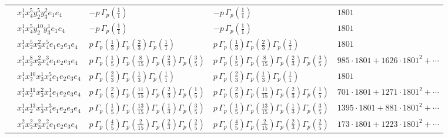 \documentclass[11pt]{article}
\begin{document}
\begin{table}[ht]
{\begin{tabular}{@{}lllll@{}}
 & $x_{1}^{1} x_{4}^{5} y_{2}^{5} y_{3}^{2} e_{1} e_{4}$ & $- p \, \Gamma_p \left( \frac{1}{1} \right)$ & $- p \, \Gamma_p \left( \frac{1}{1} \right)$ & $1801$ \\
 & $x_{1}^{1} x_{4}^{5} y_{2}^{10} y_{3}^{1} e_{1} e_{4}$ & $- p \, \Gamma_p \left( \frac{1}{1} \right)$ & $- p \, \Gamma_p \left( \frac{1}{1} \right)$ & $1801$ \\
 & $x_{1}^{1} x_{2}^{5} x_{3}^{2} x_{4}^{5}  e_{1} e_{2} e_{3} e_{4}$ & $p \, \Gamma_p \left( \frac{1}{3} \right) \Gamma_p \left( \frac{2}{3} \right) \Gamma_p \left( \frac{1}{1} \right)$ & $p \, \Gamma_p \left( \frac{1}{3} \right) \Gamma_p \left( \frac{2}{3} \right) \Gamma_p \left( \frac{1}{1} \right)$ & $1801$ \\
 & $x_{1}^{1} x_{2}^{8} x_{3}^{2} x_{4}^{3}  e_{1} e_{2} e_{3} e_{4}$ & $p \, \Gamma_p \left( \frac{1}{5} \right) \Gamma_p \left( \frac{8}{15} \right) \Gamma_p \left( \frac{2}{3} \right) \Gamma_p \left( \frac{3}{5} \right)$ & $p \, \Gamma_p \left( \frac{1}{5} \right) \Gamma_p \left( \frac{8}{15} \right) \Gamma_p \left( \frac{2}{3} \right) \Gamma_p \left( \frac{3}{5} \right)$ & $985{\cdot}1801{+}1626{\cdot}1801^{2}{+}\cdots$ \\
 & $x_{1}^{1} x_{2}^{10} x_{3}^{1} x_{4}^{5}  e_{1} e_{2} e_{3} e_{4}$ & $p \, \Gamma_p \left( \frac{2}{3} \right) \Gamma_p \left( \frac{1}{3} \right) \Gamma_p \left( \frac{1}{1} \right)$ & $p \, \Gamma_p \left( \frac{2}{3} \right) \Gamma_p \left( \frac{1}{3} \right) \Gamma_p \left( \frac{1}{1} \right)$ & $1801$ \\
 & $x_{1}^{1} x_{2}^{11} x_{3}^{2} x_{4}^{1}  e_{1} e_{2} e_{3} e_{4}$ & $p \, \Gamma_p \left( \frac{2}{5} \right) \Gamma_p \left( \frac{11}{15} \right) \Gamma_p \left( \frac{2}{3} \right) \Gamma_p \left( \frac{1}{5} \right)$ & $p \, \Gamma_p \left( \frac{2}{5} \right) \Gamma_p \left( \frac{11}{15} \right) \Gamma_p \left( \frac{2}{3} \right) \Gamma_p \left( \frac{1}{5} \right)$ & $701{\cdot}1801{+}1271{\cdot}1801^{2}{+}\cdots$ \\
 & $x_{1}^{1} x_{2}^{13} x_{3}^{1} x_{4}^{3}  e_{1} e_{2} e_{3} e_{4}$ & $p \, \Gamma_p \left( \frac{1}{5} \right) \Gamma_p \left( \frac{13}{15} \right) \Gamma_p \left( \frac{1}{3} \right) \Gamma_p \left( \frac{3}{5} \right)$ & $p \, \Gamma_p \left( \frac{1}{5} \right) \Gamma_p \left( \frac{13}{15} \right) \Gamma_p \left( \frac{1}{3} \right) \Gamma_p \left( \frac{3}{5} \right)$ & $1395{\cdot}1801{+}881{\cdot}1801^{2}{+}\cdots$ \\
 & $x_{1}^{2} x_{2}^{2} x_{3}^{2} x_{4}^{2}  e_{1} e_{2} e_{3} e_{4}$ & $p \, \Gamma_p \left( \frac{4}{5} \right) \Gamma_p \left( \frac{2}{15} \right) \Gamma_p \left( \frac{2}{3} \right) \Gamma_p \left( \frac{2}{5} \right)$ & $p \, \Gamma_p \left( \frac{4}{5} \right) \Gamma_p \left( \frac{2}{15} \right) \Gamma_p \left( \frac{2}{3} \right) \Gamma_p \left( \frac{2}{5} \right)$ & $173{\cdot}1801{+}1223{\cdot}1801^{2}{+}\cdots$ \\

\end{tabular}}
\end{table}
\end{document}
